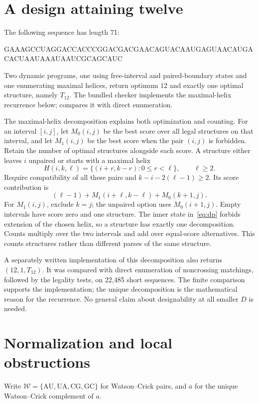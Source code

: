 \documentclass[11pt,a4paper]{article}
\theoremstyle{definition}
\newcommand{\WC}{\mathcal W}
\begin{document}
\section{A design attaining twelve}\label{sec:lower}
The following sequence has length 71:
\begin{center}\small\ttfamily
GAAAGCCUAGGACCACCCGGACGACGAACAGUACAAUGAGUAACAUGACACUAAUAAAUAAUCGCAGCAUC
\end{center}
Two dynamic programs, one using free-interval and paired-boundary
states and one enumerating maximal helices, return optimum $12$ and
exactly one optimal structure, namely $T_{12}$. The bundled checker
 implements the maximal-helix recurrence below;
 compares it with direct enumeration.

The maximal-helix decomposition explains both optimization and counting.
For an interval $[i,j]$, let $M_0(i,j)$ be the best score over all legal
structures on that interval, and let $M_1(i,j)$ be the best score when
the pair $(i,j)$ is forbidden. Retain the number of optimal structures
alongside each score. A structure either
leaves $i$ unpaired or starts with a maximal helix
\[
 H(i,k,\ell)=\{(i+r,k-r):0\leq r<\ell\},\qquad \ell\geq2.
\]
Require compatibility of all these pairs and
$k-i-2(\ell-1)\geq2$. Its score contribution is
\begin{equation}\label{eq:dp}
 (\ell-1)+M_1(i+\ell,k-\ell)+M_0(k+1,j).
\end{equation}
For $M_1(i,j)$, exclude $k=j$; the unpaired option uses
$M_0(i+1,j)$. Empty intervals have score zero and one structure.
The inner state in~\eqref{eq:dp} forbids extension of the chosen
helix, so a structure has exactly one decomposition. Counts multiply
over the two intervals and add over equal-score alternatives. This
counts structures rather than different parses of the same structure.

A separately written implementation of this decomposition also returns
$(12,1,T_{12})$. It was compared with direct enumeration of noncrossing
matchings, followed by the legality tests, on 22,485 short sequences.
The finite comparison supports the implementation; the unique
decomposition is the mathematical reason for the recurrence. No
general claim about designability at all smaller $D$ is needed.

\section{Normalization and local obstructions}\label{sec:local}
Write $\WC=\{\mathrm{AU},\mathrm{UA},\mathrm{CG},\mathrm{GC}\}$ for
Watson--Crick pairs, and $\overline a$ for the unique Watson--Crick
complement of $a$.
\end{document}
